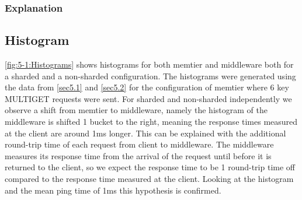 \documentclass[11pt,a4paper]{article}
\begin{document}
\subsubsection{Explanation}


\subsection{Histogram}
\autoref{fig:5-1:Histograms} shows histograms for both memtier and middleware both for a sharded and a non-sharded configuration. The histograms were generated using the data from \autoref{sec5.1} and \autoref{sec5.2} for the configuration of memtier where 6 key MULTIGET requests were sent. For sharded and non-sharded independently we observe a shift from memtier to middleware, namely the histogram of the middleware is shifted 1 bucket to the right, meaning the response times measured at the client are around 1ms longer. This can be explained with the additional round-trip time of each request from client to middleware. The middleware measures its response time from the arrival of the request until before it is returned to the client, so we expect the response time to be 1 round-trip time off compared to the response time measured at the client. Looking at the histogram and the mean ping time of 1ms this hypothesis is confirmed.
\end{document}
